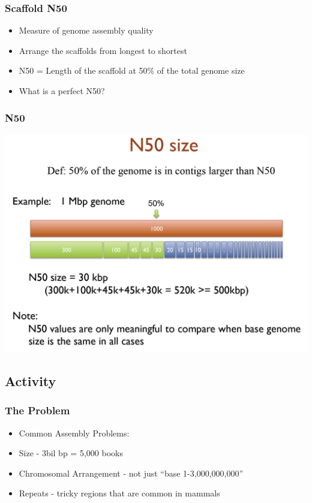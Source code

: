 \documentclass[14pt,handout]{beamer}
\begin{document}
\begin{frame}
\frametitle{Scaffold N50}
\begin{itemize}
	\item<+-> Measure of genome assembly quality
	\item<+-> Arrange the scaffolds from longest to shortest
	\item<+-> N50 = Length of the scaffold at 50\% of the total genome size
	\item<+-> What is a perfect N50?
\end{itemize}
\end{frame}

\begin{frame}
\frametitle{N50}
\begin{center}
	\includegraphics[width=1\textwidth]{images_20171024_n50.png}
\end{center}
\end{frame}


\subsection{Activity}
\begin{frame}
\frametitle{The Problem}
\begin{itemize}
	\item<+-> Common Assembly Problems:
	\item<+-> Size - 3bil bp = 5,000 books
	\item<+-> Chromosomal Arrangement - not just ``base 1-3,000,000,000''
	\item<+-> Repeats - tricky regions that are common in mammals
\end{itemize}
\end{frame}
\end{document}
